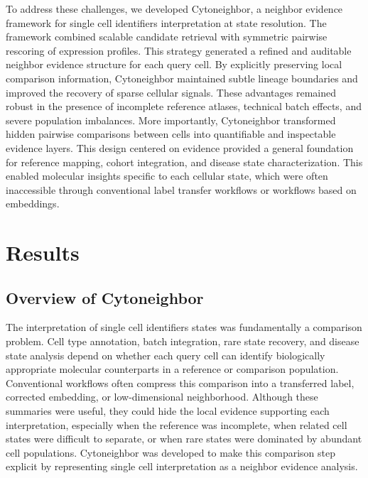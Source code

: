 \documentclass[11pt]{article}
\begin{document}
To address these challenges, we developed Cytoneighbor, a neighbor evidence framework for single cell identifiers interpretation at state resolution. The framework combined scalable candidate retrieval with symmetric pairwise rescoring of expression profiles. This strategy generated a refined and auditable neighbor evidence structure for each query cell. By explicitly preserving local comparison information, Cytoneighbor maintained subtle lineage boundaries and improved the recovery of sparse cellular signals. These advantages remained robust in the presence of incomplete reference atlases, technical batch effects, and severe population imbalances. More importantly, Cytoneighbor transformed hidden pairwise comparisons between cells into quantifiable and inspectable evidence layers. This design centered on evidence provided a general foundation for reference mapping, cohort integration, and disease state characterization. This enabled molecular insights specific to each cellular state, which were often inaccessible through conventional label transfer workflows or workflows based on embeddings.

\section*{Results}

\subsection*{Overview of Cytoneighbor}

The interpretation of single cell identifiers states was fundamentally a comparison problem. Cell type annotation, batch integration, rare state recovery, and disease state analysis depend on whether each query cell can identify biologically appropriate molecular counterparts in a reference or comparison population. Conventional workflows often compress this comparison into a transferred label, corrected embedding, or low-dimensional neighborhood. Although these summaries were useful, they could hide the local evidence supporting each interpretation, especially when the reference was incomplete, when related cell states were difficult to separate, or when rare states were dominated by abundant cell populations. Cytoneighbor was developed to make this comparison step explicit by representing single cell interpretation as a neighbor evidence analysis.
\end{document}
